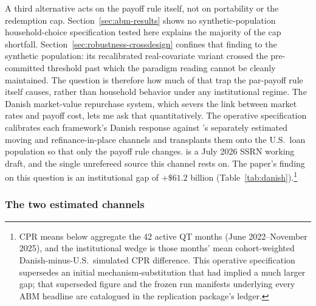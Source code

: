 \documentclass[12pt]{article}
\begin{document}
A third alternative acts on the payoff rule itself, not on portability or the redemption cap. Section~\ref{sec:abm-results} shows no synthetic-population household-choice specification tested here explains the majority of the cap shortfall. Section~\ref{sec:robustness-crossdesign} confines that finding to the synthetic population: its recalibrated real-covariate variant crossed the pre-committed threshold past which the paradigm reading cannot be cleanly maintained. The question is therefore how much of that trap the par-payoff rule itself causes, rather than household behavior under any institutional regime. The Danish market-value repurchase system, which severs the link between market rates and payoff cost, lets me ask that quantitatively. The operative specification calibrates each framework's Danish response against \citet{berger2026}'s separately estimated moving and refinance-in-place channels and transplants them onto the U.S.\ loan population so that only the payoff rule changes. \citet{berger2026} is a July 2026 SSRN working draft, and the single unrefereed source this channel rests on. The paper's finding on this question is an institutional gap of $+\$61.2$ billion (Table~\ref{tab:danish}).\footnote{\label{fn:manifest}CPR means below aggregate the 42 active QT months (June 2022--November 2025), and the institutional wedge is those months' mean cohort-weighted Danish-minus-U.S.\ simulated CPR difference. This operative specification supersedes an initial mechanism-substitution that had implied a much larger gap; that superseded figure and the frozen run manifests underlying every ABM headline are catalogued in the replication package's ledger.}

\subsubsection{The two estimated channels}
\end{document}
